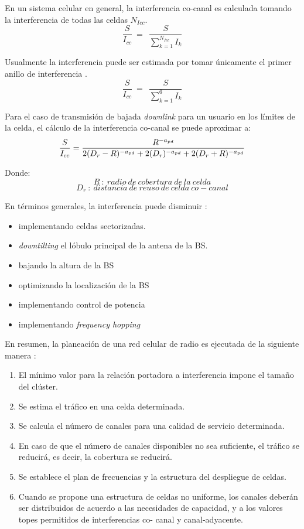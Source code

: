 En un sistema celular en general, la interferencia co-canal es calculada tomando la interferencia de todas las celdas $N_{Icc}$.
\begin{equation}
\frac{S}{I_{cc}}\ =\ \ \frac{S}{\sum^{N_{Icc}}_{k=1}{I_k}} 
\label{eqn:Icc}
\end{equation}

Usualmente la interferencia puede ser estimada por tomar únicamente el primer anillo de interferencia \parencite{Correia2018}.
\begin{equation}
\frac{S}{I_{cc}}\ =\ \ \frac{S}{\sum^6_{k=1}{I_k}} 
\label{eqn:I}
\end{equation}

Para el caso de transmisión de bajada \textit{downlink} para un usuario en los límites de la celda, el cálculo de la interferencia co-canal se puede aproximar a:\newline
\begin{equation}
    \frac{S}{I_{cc}}=\frac{R^{-a_{pd}}}{ 2(D_{r}-R)^{-a_{pd}}+2(D_{r})^{-a_{pd}} + 2(D_{r}+R)^{-a_{pd}}}\\
    \label{eqn:SIcc}
\end{equation}

Donde:
\[R\ :\ radio\ de\ cobertura\ de\ la\ celda\] 
\[D_{r}\ :\ distancia\ de\ reuso\ de\ celda\ co-canal\] 

En términos generales, la interferencia puede disminuir \parencite{Correia2018}:
\begin{itemize}
    \item implementando celdas sectorizadas.
    \item \textit{downtilting} el lóbulo principal de la antena de la BS.
    \item bajando la altura de la BS
    \item optimizando la localización de la BS
    \item implementando control de potencia
    \item implementando \textit{frequency hopping }
\end{itemize}

En resumen, la planeación de una red celular de radio es ejecutada de la siguiente manera \parencite{Correia2018}:
\begin{enumerate}
    \item El mínimo valor para la relación portadora a interferencia impone el tamaño del clúster.
    \item Se estima el tráfico en una celda determinada.
    \item Se calcula el número de canales para una calidad de servicio determinada.
    \item En caso de que el número de canales disponibles no sea suficiente, el tráfico se reducirá, es decir, la cobertura se reducirá.
    \item Se establece el plan de frecuencias y la estructura del despliegue de celdas.
    \item Cuando se propone una estructura de celdas no uniforme, los canales deberán ser distribuidos de acuerdo a las necesidades de capacidad, y a los valores topes permitidos de interferencias co- canal y canal-adyacente.
\end{enumerate}\

